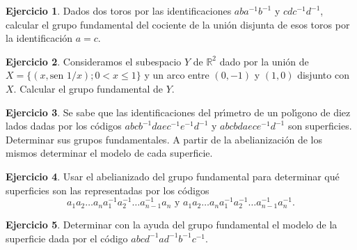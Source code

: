 \documentclass{article}
\theoremstyle{plain}
\theoremstyle{definition}
\newtheorem{exercise}{Ejercicio}
\begin{document}
\begin{exercise}

Dados dos toros por las identificaciones $aba^{-1}b^{-1}$ y $cdc^{-1}d^{-1}$, calcular el grupo fundamental del cociente de la uni\'on disjunta de esos toros por la identificaci\'on $a=c$.

\end{exercise}

\begin{exercise}

Consideramos el subespacio $Y$ de $\mathbb{R}^2$ dado por la uni\'on de $X=\{(x,\textrm{sen }1/x);0<x\leq 1\}$ y un arco entre $(0,-1)$ y $(1,0)$ disjunto con $X$. Calcular el grupo fundamental de $Y$.

\end{exercise}

\begin{exercise}
Se sabe que las identificaciones del pr\'{\i}metro de  un pol\'{\i}gono de diez lados dadas por los c\'odigos $abcb^{-1}daec^{-1}e^{-1}d^{-1}$ y $abcbdaece^{-1}d^{-1}$ son
superficies. Determinar sus grupos fundamentales. A partir de la abelianizaci\'on de los mismos determinar el modelo de cada superficie.
\end{exercise}

\begin{exercise}
Usar el abelianizado del grupo fundamental para determinar qu\'e superficies son las representadas por los c\'odigos
$$
a_1a_2\dots a_n a^{-1}_1a^{-1}_2\dots a^{-1}_{n-1}a_n \mbox{ y } a_1a_2\dots a_na^{-1}_1a^{-1}_2\dots a^{-1}_{n-1}a^{-1}_n.
$$
\end{exercise}

\begin{exercise}
Determinar con la ayuda del grupo fundamental el modelo de la superficie dada por  el c\'odigo $abcd^{-1}ad^{-1}b^{-1}c^{-1}$.
\end{exercise}
\end{document}
